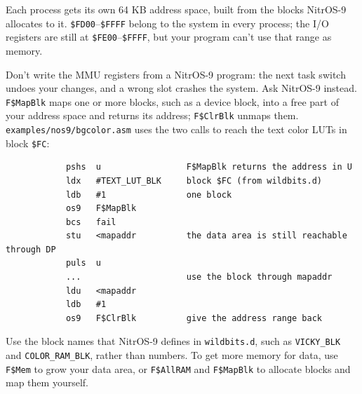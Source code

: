 Each process gets its own 64 KB address space, built from the blocks NitrOS-9 allocates to it. \verb+$FD00+--\verb+$FFFF+ belong to the system in every process; the I/O registers are still at \verb+$FE00+--\verb+$FFFF+, but your program can't use that range as memory.

Don't write the MMU registers from a NitrOS-9 program: the next task switch undoes your changes, and a wrong slot crashes the system. Ask NitrOS-9 instead. \verb+F$MapBlk+ maps one or more blocks, such as a device block, into a free part of your address space and returns its address; \verb+F$ClrBlk+ unmaps them. \verb+examples/nos9/bgcolor.asm+ uses the two calls to reach the text color LUTs in block \verb+$FC+:

\begin{verbatim}
            pshs  u                 F$MapBlk returns the address in U
            ldx   #TEXT_LUT_BLK     block $FC (from wildbits.d)
            ldb   #1                one block
            os9   F$MapBlk
            bcs   fail
            stu   <mapaddr          the data area is still reachable through DP
            puls  u
            ...                     use the block through mapaddr
            ldu   <mapaddr
            ldb   #1
            os9   F$ClrBlk          give the address range back
\end{verbatim}

Use the block names that NitrOS-9 defines in \verb+wildbits.d+, such as \verb+VICKY_BLK+ and \verb+COLOR_RAM_BLK+, rather than numbers. To get more memory for data, use \verb+F$Mem+ to grow your data area, or \verb+F$AllRAM+ and \verb+F$MapBlk+ to allocate blocks and map them yourself.
